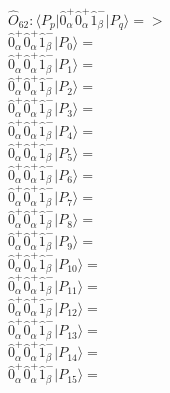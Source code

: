 \documentclass[14pt]{article}
\begin{document}
    $\hat{O}_{62}:  \langle{P_p}\vert \hat{0}_{\alpha}^{+}\hat{0}_{\alpha}^{+}\hat{1}_{\beta}^{-} \vert{P_q}\rangle => $ \\ 
    $ \hat{0}_{\alpha}^{+}\hat{0}_{\alpha}^{+}\hat{1}_{\beta}^{-} \vert{P_{0}}\rangle =  $ \\ 
    $ \hat{0}_{\alpha}^{+}\hat{0}_{\alpha}^{+}\hat{1}_{\beta}^{-} \vert{P_{1}}\rangle =  $ \\ 
    $ \hat{0}_{\alpha}^{+}\hat{0}_{\alpha}^{+}\hat{1}_{\beta}^{-} \vert{P_{2}}\rangle =  $ \\ 
    $ \hat{0}_{\alpha}^{+}\hat{0}_{\alpha}^{+}\hat{1}_{\beta}^{-} \vert{P_{3}}\rangle =  $ \\ 
    $ \hat{0}_{\alpha}^{+}\hat{0}_{\alpha}^{+}\hat{1}_{\beta}^{-} \vert{P_{4}}\rangle =  $ \\ 
    $ \hat{0}_{\alpha}^{+}\hat{0}_{\alpha}^{+}\hat{1}_{\beta}^{-} \vert{P_{5}}\rangle =  $ \\ 
    $ \hat{0}_{\alpha}^{+}\hat{0}_{\alpha}^{+}\hat{1}_{\beta}^{-} \vert{P_{6}}\rangle =  $ \\ 
    $ \hat{0}_{\alpha}^{+}\hat{0}_{\alpha}^{+}\hat{1}_{\beta}^{-} \vert{P_{7}}\rangle =  $ \\ 
    $ \hat{0}_{\alpha}^{+}\hat{0}_{\alpha}^{+}\hat{1}_{\beta}^{-} \vert{P_{8}}\rangle =  $ \\ 
    $ \hat{0}_{\alpha}^{+}\hat{0}_{\alpha}^{+}\hat{1}_{\beta}^{-} \vert{P_{9}}\rangle =  $ \\ 
    $ \hat{0}_{\alpha}^{+}\hat{0}_{\alpha}^{+}\hat{1}_{\beta}^{-} \vert{P_{10}}\rangle =  $ \\ 
    $ \hat{0}_{\alpha}^{+}\hat{0}_{\alpha}^{+}\hat{1}_{\beta}^{-} \vert{P_{11}}\rangle =  $ \\ 
    $ \hat{0}_{\alpha}^{+}\hat{0}_{\alpha}^{+}\hat{1}_{\beta}^{-} \vert{P_{12}}\rangle =  $ \\ 
    $ \hat{0}_{\alpha}^{+}\hat{0}_{\alpha}^{+}\hat{1}_{\beta}^{-} \vert{P_{13}}\rangle =  $ \\ 
    $ \hat{0}_{\alpha}^{+}\hat{0}_{\alpha}^{+}\hat{1}_{\beta}^{-} \vert{P_{14}}\rangle =  $ \\ 
    $ \hat{0}_{\alpha}^{+}\hat{0}_{\alpha}^{+}\hat{1}_{\beta}^{-} \vert{P_{15}}\rangle =  $ \\ 
    
\end{document}
